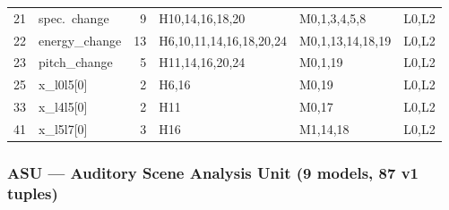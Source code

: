 {\begin{longtable}{@{}r l r l l l@{}}
\rowcolor{grpD}
21 & spec.~change & 9 & H10,14,16,18,20 & M0,1,3,4,5,8 & L0,L2 \\
\rowcolor{grpD}
22 & energy\_change & 13 & H6,10,11,14,16,18,20,24 & M0,1,13,14,18,19 & L0,L2 \\
\rowcolor{grpD}
23 & pitch\_change & 5 & H11,14,16,20,24 & M0,1,19 & L0,L2 \\
\rowcolor{grpE}
25 & x\_l0l5[0] & 2 & H6,16 & M0,19 & L0,L2 \\
\rowcolor{grpE}
33 & x\_l4l5[0] & 2 & H11 & M0,17 & L0,L2 \\
\rowcolor{grpE}
41 & x\_l5l7[0] & 3 & H16 & M1,14,18 & L0,L2 \\
\end{longtable}
}


\subsubsection*{ASU --- Auditory Scene Analysis Unit (9 models, 87 v1 tuples)}

